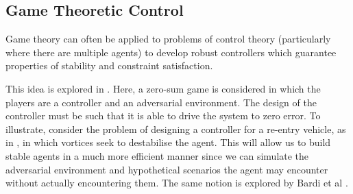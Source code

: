 \documentclass[.../main.tex]{subfiles}
\begin{document}
\subsection{Game Theoretic Control} \label{Game Theoretic Control}

Game theory can often be applied to problems of control theory
(particularly where there are multiple agents) to develop robust
controllers which guarantee properties of stability and constraint
satisfaction.

This idea is explored in \cite{Marden2018AnnualControl}. Here, a
zero-sum game is considered in which the players are a controller and
an adversarial environment. The design of the controller must be such
that it is able to drive the system to zero error. To illustrate,
consider the problem of designing a controller for a re-entry vehicle,
as in \cite{Breitner1994ReentryGame}, in which vortices seek to
destabilise the agent. This will allow us to build stable agents in a
much more efficient manner since we can simulate the adversarial
environment and hypothetical scenarios the agent may encounter without
actually encountering them. The same notion is explored by Bardi et al
\cite{Bardi1991DifferentialDisturbances}.
\end{document}
